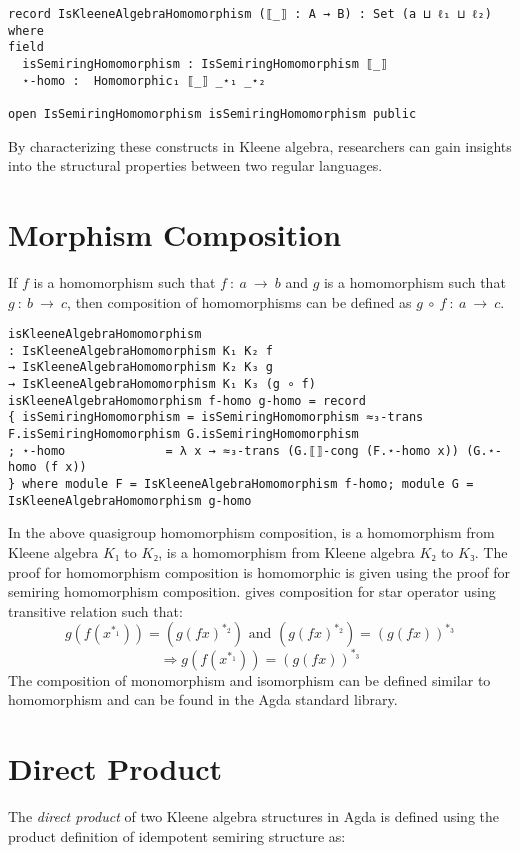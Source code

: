 \begin{verbatim}
record IsKleeneAlgebraHomomorphism (⟦_⟧ : A → B) : Set (a ⊔ ℓ₁ ⊔ ℓ₂) where
field
  isSemiringHomomorphism : IsSemiringHomomorphism ⟦_⟧
  ⋆-homo :  Homomorphic₁ ⟦_⟧ _⋆₁ _⋆₂

open IsSemiringHomomorphism isSemiringHomomorphism public
\end{verbatim}

By characterizing these constructs in Kleene algebra, researchers can gain
insights into the structural properties between two regular languages.

\section{Morphism Composition}
If $f$ is a homomorphism such that $f\ :\ a \ \rightarrow \ b$ and $g$ is a
homomorphism such that $g\ :\ b\ \rightarrow \ c$, then composition of
homomorphisms can be defined as $g \ ∘\ f\ :\ a \ \rightarrow \ c$.

\begin{verbatim}
isKleeneAlgebraHomomorphism
: IsKleeneAlgebraHomomorphism K₁ K₂ f
→ IsKleeneAlgebraHomomorphism K₂ K₃ g
→ IsKleeneAlgebraHomomorphism K₁ K₃ (g ∘ f)
isKleeneAlgebraHomomorphism f-homo g-homo = record
{ isSemiringHomomorphism = isSemiringHomomorphism ≈₃-trans F.isSemiringHomomorphism G.isSemiringHomomorphism
; ⋆-homo              = λ x → ≈₃-trans (G.⟦⟧-cong (F.⋆-homo x)) (G.⋆-homo (f x))
} where module F = IsKleeneAlgebraHomomorphism f-homo; module G = IsKleeneAlgebraHomomorphism g-homo
\end{verbatim}

In the above quasigroup homomorphism composition,  is a homomorphism
from Kleene algebra $K₁$ to $K₂$,  is a homomorphism from Kleene
algebra $K₂$ to $K₃$. The proof for homomorphism composition is homomorphic is
given using the proof for semiring homomorphism composition. 
gives composition for star operator using transitive relation such that: 
\[g (f (x^{*_1})) = (g (f x) ^{*_2}) \text{ and } (g (f x) ^{*_2}) = (g (f x))^{*_3}\] 
\[\Rightarrow g (f (x^{*_1})) = (g (f x))^{*_3}\] The composition of
monomorphism and isomorphism can be defined similar to homomorphism and can be
found in the Agda standard library.

\section{Direct Product}
The \textit{direct product} of two Kleene algebra structures in Agda is defined
using the product definition of idempotent semiring structure as:

